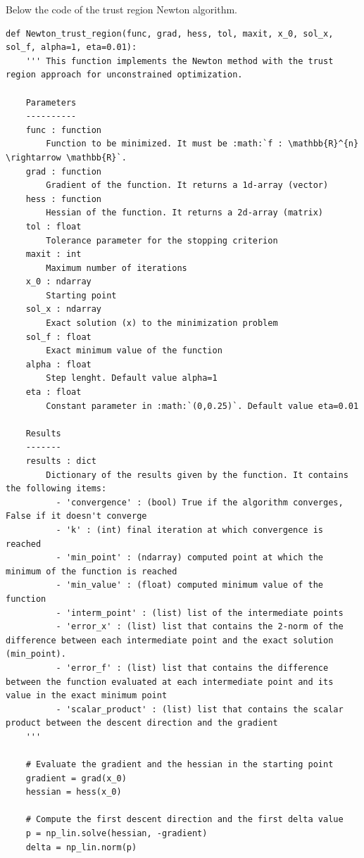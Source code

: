 \documentclass[a4paper,11pt]{article}
\begin{document}
\noindent Below the code of the trust region Newton algorithm.


\begin{verbatim}
def Newton_trust_region(func, grad, hess, tol, maxit, x_0, sol_x, sol_f, alpha=1, eta=0.01):
    ''' This function implements the Newton method with the trust region approach for unconstrained optimization.

    Parameters
    ----------
    func : function
        Function to be minimized. It must be :math:`f : \mathbb{R}^{n} \rightarrow \mathbb{R}`.
    grad : function
        Gradient of the function. It returns a 1d-array (vector)
    hess : function
        Hessian of the function. It returns a 2d-array (matrix)
    tol : float
        Tolerance parameter for the stopping criterion
    maxit : int
        Maximum number of iterations
    x_0 : ndarray
        Starting point
    sol_x : ndarray
        Exact solution (x) to the minimization problem
    sol_f : float
        Exact minimum value of the function
    alpha : float
        Step lenght. Default value alpha=1
    eta : float
        Constant parameter in :math:`(0,0.25)`. Default value eta=0.01
        
    Results
    -------
    results : dict
        Dictionary of the results given by the function. It contains the following items:
          - 'convergence' : (bool) True if the algorithm converges, False if it doesn't converge
          - 'k' : (int) final iteration at which convergence is reached
          - 'min_point' : (ndarray) computed point at which the minimum of the function is reached
          - 'min_value' : (float) computed minimum value of the function
          - 'interm_point' : (list) list of the intermediate points
          - 'error_x' : (list) list that contains the 2-norm of the difference between each intermediate point and the exact solution (min_point). 
          - 'error_f' : (list) list that contains the difference between the function evaluated at each intermediate point and its value in the exact minimum point
          - 'scalar_product' : (list) list that contains the scalar product between the descent direction and the gradient
    '''

    # Evaluate the gradient and the hessian in the starting point
    gradient = grad(x_0)
    hessian = hess(x_0)

    # Compute the first descent direction and the first delta value
    p = np_lin.solve(hessian, -gradient)
    delta = np_lin.norm(p)


\end{verbatim}
\end{document}
